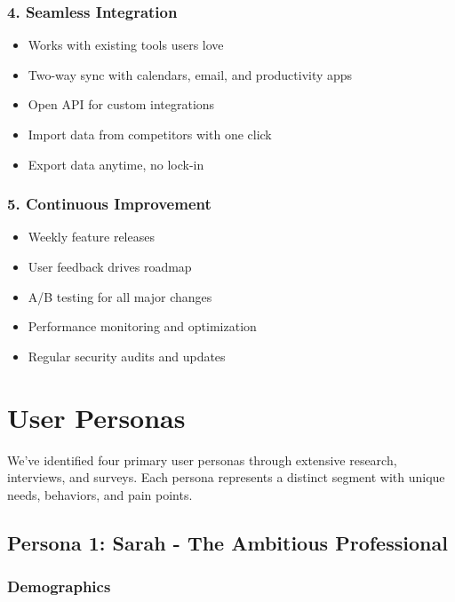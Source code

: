 \subsubsection{4. Seamless Integration}

\begin{itemize}
    \item Works with existing tools users love
    \item Two-way sync with calendars, email, and productivity apps
    \item Open API for custom integrations
    \item Import data from competitors with one click
    \item Export data anytime, no lock-in
\end{itemize}

\subsubsection{5. Continuous Improvement}

\begin{itemize}
    \item Weekly feature releases
    \item User feedback drives roadmap
    \item A/B testing for all major changes
    \item Performance monitoring and optimization
    \item Regular security audits and updates
\end{itemize}

\section{User Personas}

We've identified four primary user personas through extensive research, interviews, and surveys. Each persona represents a distinct segment with unique needs, behaviors, and pain points.

\subsection{Persona 1: Sarah - The Ambitious Professional}

\subsubsection{Demographics}

